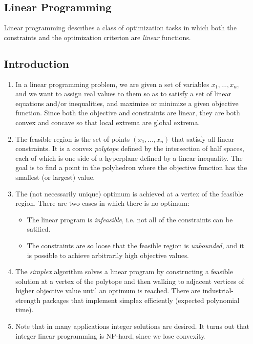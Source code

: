 \documentclass[10pt]{article}
\begin{document}
\begin{multicols}{2}
\vspace{-0.4cm}
\section{Linear Programming}
\begin{addmargin}[0.8em]{0.5em}
Linear programming describes a class of optimization tasks in which both the constraints and the optimization criterion are \textit{linear} functions.
    \subsection{Introduction}
    \vspace{-0.4cm}
    \begin{enumerate}[label=(\alph*)]
        \item In a linear programming problem, we are given a set of variables $x_1, \hdots, x_n$, and we want to assign real values to them so as to satisfy a set of linear equations and/or inequalities, and maximize or minimize a given objective function. Since both the objective and constraints are linear, they are both convex and concave so that local extrema are global extrema.
        \item The feasible region is the set of points $(x_1,\hdots,x_n)$ that satisfy all linear constraints. It is a convex \textit{polytope} defined by the intersection of half spaces, each of which is one side of a hyperplane defined by a linear inequality. The goal is to find a point in the polyhedron where the objective function has the smallest (or largest) value.
        \item The (not necessarily unique) optimum is achieved at a vertex of the feasible region. There are two cases in which there is no optimum:
        \begin{itemize}
        \item The linear program is \textit{infeasible}, i.e. not all of the constraints can be satified.
        \item The constraints are so loose that the feasible region is \textit{unbounded}, and it is possible to achieve arbitrarily high objective values.
        \end{itemize}
        \item The \textit{simplex} algorithm solves a linear program by constructing a feasible solution at a vertex of the polytope and then walking to adjacent vertices of higher objective value until an optimum is reached.
        There are industrial-strength packages that implement simplex efficiently (expected polynomial time).
        \item Note that in many applications integer solutions are desired. It turns out that integer linear programming is NP-hard, since we lose convexity.
    \end{enumerate}
    \vspace{-0.4cm}

\end{addmargin}
\end{multicols}
\end{document}
